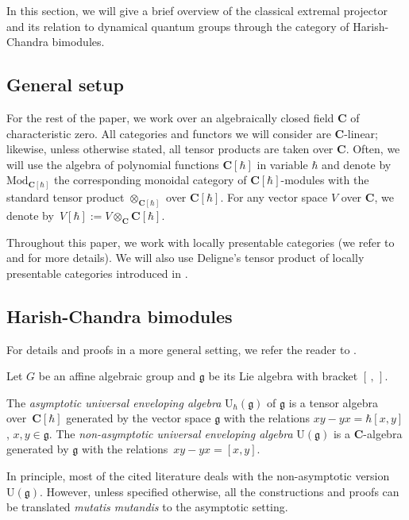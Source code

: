 \documentclass[11pt]{article}
\numberwithin{equation}{section}
\newcommand{\C}{\mathbf{C}}
\newcommand{\U}{\mathrm{U}_{\hbar}}
\newcommand{\g}{\mathfrak{g}}
\newcommand{\Mod}[1]{{\mathrm{Mod}}_{#1}}
\begin{document}
	In this section, we will give a brief overview of the classical extremal projector and its relation to dynamical quantum groups through the category of Harish-Chandra bimodules.
	
	\subsection{General setup}
	\label{subsect::general_setup}
	For the rest of the paper, we work over an algebraically closed field $\C$ of characteristic zero. All categories and functors we will consider are $\C$-linear; likewise, unless otherwise stated, all tensor products are taken over $\C$. Often, we will use the algebra of polynomial functions $\C[\hbar]$ in variable $\hbar$ and denote by $\Mod{\C[\hbar]}$ the corresponding monoidal category of $\C[\hbar]$-modules with the standard tensor product $\otimes_{\C[\hbar]}$ over $\C[\hbar]$. For any vector space $V$ over $\C$, we denote by~${V[\hbar]:= V \otimes_{\C} \C[\hbar]}$.
	
Throughout this paper, we work with locally presentable categories (we refer to \cite{AdamekRosicky} and \cite[Section 2]{BCJF} for more details). We will also use Deligne's tensor product of locally presentable categories introduced in \cite{Deligne}.
	
	
	\subsection{Harish-Chandra bimodules}
	\label{subsect::hc_bimod}
	For details and proofs in a more general setting, we refer the reader to \cite[Section 2]{KalmykovSafronov}.
	
	Let $G$ be an affine algebraic group and $\g$ be its Lie algebra with bracket $[\,,\,]$.
	
	\begin{Definition}
		\label{def::asympt_uea}
		The \emph{asymptotic universal enveloping algebra} $\U(\g)$ of $\g$ is a tensor algebra over~$\C[\hbar]$ generated by the vector space $\g$ with the relations
$
		xy - yx = \hbar [x,y]$, $ x,y\in \g$.
		The \emph{non-asymptotic universal enveloping algebra} $\mathrm{U}(\g)$ is a $\C$-algebra generated by $\g$ with the relations~${xy - yx = [x,y]}$.
	\end{Definition}
	
	\begin{Remark}
		In principle, most of the cited literature deals with the non-asymptotic version~$\mathrm{U}(\g)$. However, unless specified otherwise, all the constructions and proofs can be translated \emph{mutatis mutandis} to the asymptotic setting.
	\end{Remark}
	
\end{document}
